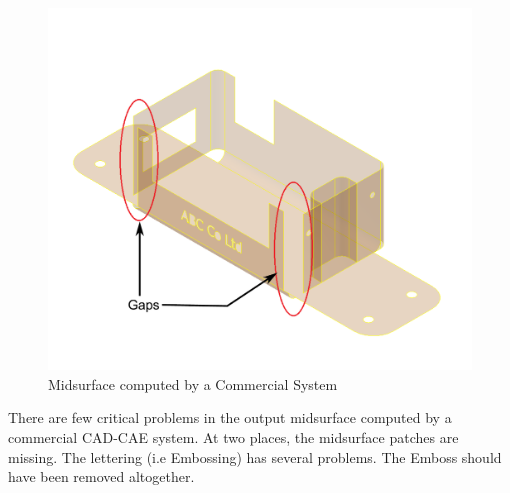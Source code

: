 



\begin{figure}[!h]
\centering     %
\includegraphics[width=0.62\linewidth,valign=t]{../Common/images/SheetMetal_Medium_Enclosure_InventorMidsurfwithErrors.pdf}
\caption{Midsurface computed by a Commercial System}
\label{fig:results:InventorMidsurfwithErrors}
\end{figure}


%
%
%

There are few critical problems in the output midsurface computed by a commercial CAD-CAE system. At two places, the midsurface patches are missing. The lettering (i.e Embossing) has several problems. The Emboss should have been removed altogether.%

